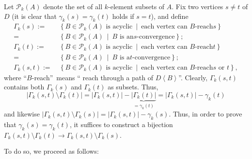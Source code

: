 \documentclass[numbers=enddot,12pt,final,onecolumn,notitlepage]{scrartcl}%
\theoremstyle{definition}
\theoremstyle{plainsl}
\begin{document}
Let $\mathcal{P}_{k}\left(  A\right)  $ denote the set of all $k$-element
subsets of $A$. Fix two vertices $s\neq t$ of $D$ (it is clear that
$\gamma_{k}\left(  s\right)  =\gamma_{k}\left(  t\right)  $ holds if $s=t$),
and define
\begin{align*}
\Gamma_{k}\left(  s\right)  :=  &  \ \left\{  B\in\mathcal{P}_{k}\left(
A\right)  \text{ is acyclic}\ \mid\ \text{each vertex can }B\text{-reach
}s\right\} \\
=  &  \ \left\{  B\in\mathcal{P}_{k}\left(  A\right)  \ \mid\ B\text{ is an
}s\text{-convergence}\right\}  ;\\
\Gamma_{k}\left(  t\right)  :=  &  \ \left\{  B\in\mathcal{P}_{k}\left(
A\right)  \text{ is acyclic}\ \mid\ \text{each vertex can }B\text{-reach
}t\right\} \\
=  &  \ \left\{  B\in\mathcal{P}_{k}\left(  A\right)  \ \mid\ B\text{ is a
}t\text{-convergence}\right\}  ;\\
\Gamma_{k}\left(  s,t\right)  :=  &  \ \left\{  B\in\mathcal{P}_{k}\left(
A\right)  \text{ is acyclic}\ \mid\ \text{each vertex can }B\text{-reach
}s\text{ or }t\right\}  ,
\end{align*}
where \textquotedblleft$B$-reach\textquotedblright\ means \textquotedblleft
reach through a path of $D\left\langle B\right\rangle $\textquotedblright.
Clearly, $\Gamma_{k}\left(  s,t\right)  $ contains both $\Gamma_{k}\left(
s\right)  $ and $\Gamma_{k}\left(  t\right)  $ as subsets. Thus,
\[
\left\vert \Gamma_{k}\left(  s,t\right)  \setminus\Gamma_{k}\left(  t\right)
\right\vert =\left\vert \Gamma_{k}\left(  s,t\right)  \right\vert
-\underbrace{\left\vert \Gamma_{k}\left(  t\right)  \right\vert }_{=\gamma
_{k}\left(  t\right)  }=\left\vert \Gamma_{k}\left(  s,t\right)  \right\vert
-\gamma_{k}\left(  t\right)
\]
and likewise $\left\vert \Gamma_{k}\left(  s,t\right)  \setminus\Gamma
_{k}\left(  s\right)  \right\vert =\left\vert \Gamma_{k}\left(  s,t\right)
\right\vert -\gamma_{k}\left(  s\right)  $. Thus, in order to prove that
$\gamma_{k}\left(  s\right)  =\gamma_{k}\left(  t\right)  $, it suffices to
construct a bijection $\Gamma_{k}\left(  s,t\right)  \setminus\Gamma
_{k}\left(  t\right)  \rightarrow\Gamma_{k}\left(  s,t\right)  \setminus
\Gamma_{k}\left(  s\right)  $.

To do so, we proceed as follows:
\end{document}
